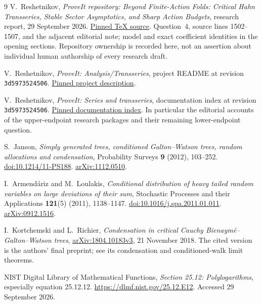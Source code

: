\documentclass[11pt,a4paper]{article}
\numberwithin{equation}{section}
\theoremstyle{definition}
\theoremstyle{remark}
\begin{document}
\begin{thebibliography}{9}
V.~Reshetnikov, \emph{ProveIt repository: Beyond Finite-Action Folds:
Critical Hahn Transseries, Stable Sector Asymptotics, and Sharp Action
Budgets}, research report, 29 September 2026.
\href{https://github.com/VladimirReshetnikov/ProveIt/blob/3d5973524506411392a911470b5ddc35521568ea/Analysis/Transseries/docs/series-and-transseries/Critical_Hahn_Transseries_Beyond_Finite_Action_Folds/article.tex}{Pinned TeX source}.
Question~4, source lines 1502--1507, and the adjacent editorial note;
model and exact coefficient identities in the opening sections.
Repository ownership is recorded here, not an assertion about individual
human authorship of every research draft.

V.~Reshetnikov, \emph{ProveIt: Analysis/Transseries}, project README at
revision \texttt{3d5973524506}.
\href{https://github.com/VladimirReshetnikov/ProveIt/blob/3d5973524506411392a911470b5ddc35521568ea/Analysis/Transseries/README.md}{Pinned project description}.

V.~Reshetnikov, \emph{ProveIt: Series and transseries}, documentation
index at revision \texttt{3d5973524506}.
\href{https://github.com/VladimirReshetnikov/ProveIt/blob/3d5973524506411392a911470b5ddc35521568ea/Analysis/Transseries/docs/series-and-transseries/README.md}{Pinned documentation index}.
In particular the editorial accounts of the upper-endpoint research
packages and their remaining lower-endpoint question.

S.~Janson, \emph{Simply generated trees, conditioned Galton--Watson trees,
random allocations and condensation}, Probability Surveys \textbf{9}
(2012), 103--252. \href{https://doi.org/10.1214/11-PS188}{doi:10.1214/11-PS188}.
\href{https://arxiv.org/abs/1112.0510}{arXiv:1112.0510}.

I.~Armend\'ariz and M.~Loulakis, \emph{Conditional distribution of heavy
tailed random variables on large deviations of their sum}, Stochastic
Processes and their Applications \textbf{121}(5) (2011), 1138--1147.
\href{https://doi.org/10.1016/j.spa.2011.01.011}{doi:10.1016/j.spa.2011.01.011}.
\href{https://arxiv.org/abs/0912.1516}{arXiv:0912.1516}.

I.~Kortchemski and L.~Richier, \emph{Condensation in critical Cauchy
Bienaym\'e--Galton--Watson trees},
\href{https://arxiv.org/abs/1804.10183v3}{arXiv:1804.10183v3},
21 November 2018. The cited version is the authors' final preprint;
see its condensation and conditioned-walk limit theorems.

NIST Digital Library of Mathematical Functions,
\emph{Section 25.12: Polylogarithms}, especially equation 25.12.12.
\url{https://dlmf.nist.gov/25.12.E12}. Accessed 29 September 2026.
\end{thebibliography}
\end{document}

